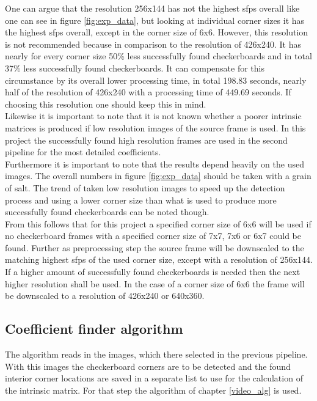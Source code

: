 One can argue that the resolution 256x144 has not the highest sfps overall like one can see in figure \ref{fig:exp_data}, but looking at individual corner sizes it has the highest sfps overall, except in the corner size of 6x6. However, this resolution is not recommended because in comparison to the resolution of 426x240. It has nearly for every corner size 50\% less successfully found checkerboards and in total 37\% less successfully found checkerboards. It can compensate for this circumstance by its overall lower processing time, in total 198.83 seconds, nearly half of the resolution of 426x240 with a processing time of 449.69 seconds. If choosing this resolution one should keep this in mind.\\

Likewise it is important to note that it is not known whether a poorer intrinsic matrices is produced if low resolution images of the source frame is used. In this project the successfully found high resolution frames are used in the second pipeline for the most detailed coefficients.\\

Furthermore it is important to note that the results depend heavily on the used images. The overall numbers in figure \ref{fig:exp_data} should be taken with a grain of salt. The trend of taken low resolution images to speed up the detection process and using a lower corner size than what is used to produce more successfully found checkerboards can be noted though.\\

From this follows that for this project a specified corner size of 6x6 will be used if no checkerboard frames with a specified corner size of 7x7, 7x6 or 6x7 could be found. Further as preprocessing step the source frame will be downscaled to the matching highest sfps of the used corner size, except with a resolution of 256x144. If a higher amount of successfully found checkerboards is needed then the next higher resolution shall be used. In the case of a corner size of 6x6 the frame will be downscaled to a resolution of 426x240 or 640x360.\\

\subsection{Coefficient finder algorithm}

The algorithm reads in the images, which there selected in the previous pipeline. With this images the checkerboard corners are to be detected and the found interior corner locations are saved in a separate list to use for the calculation of the intrinsic matrix. For that step the algorithm of chapter \ref{video_alg} is used.\\

